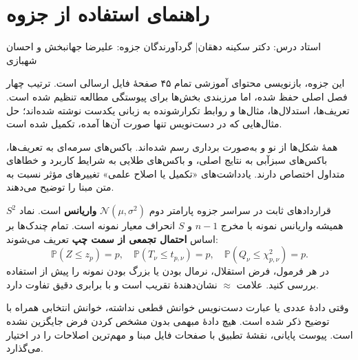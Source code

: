 \documentclass[12pt,a4paper,oneside]{report}
\newcounter{ex}[chapter]
\newcommand{\N}{\mathcal N}
\newcommand{\Prob}{\mathbb P}
\begin{document}
\setcounter{chapter}{0}
\chapter*{راهنمای استفاده از جزوه}
\begin{center}{\small\color{muted} استاد درس: دکتر سکینه دهقان\quad | \quad گردآورندگان جزوه: علیرضا جهانبخش و احسان شهبازی}\end{center}

این جزوه، بازنویسی محتوای آموزشی تمام ۴۵ صفحهٔ فایل ارسالی است. ترتیب چهار فصل اصلی حفظ شده، اما مرزبندی بخش‌ها برای پیوستگی مطالعه تنظیم شده است. تعریف‌ها، استدلال‌ها، مثال‌ها و روابط تکرارشونده به زبانی یکدست نوشته شده‌اند؛ حل مثال‌هایی که در دست‌نویس تنها صورت آن‌ها آمده، تکمیل شده است.

همهٔ شکل‌ها از نو و به‌صورت برداری رسم شده‌اند. باکس‌های سرمه‌ای به تعریف‌ها، باکس‌های سبزآبی به نتایج اصلی، و باکس‌های طلایی به شرایط کاربرد و خطاهای متداول اختصاص دارند. یادداشت‌های «تکمیل یا اصلاح علمی» تغییرهای مؤثر نسبت به متن مبنا را توضیح می‌دهند.
\begin{important}{قراردادهای ثابت در سراسر جزوه}
پارامتر دوم $\N(\mu,\sigma^2)$ \textbf{واریانس} است. نماد $S^2$ همیشه واریانس نمونه با مخرج $n-1$ و $S$ انحراف معیار نمونه است. تمام چندک‌ها بر اساس \textbf{احتمال تجمعی از سمت چپ} تعریف می‌شوند:
\[
\Prob(Z\le z_p)=p,\quad
\Prob(T_\nu\le t_{p,\nu})=p,\quad
\Prob(Q_\nu\le\chi^2_{p,\nu})=p.
\]
در هر فرمول، فرض استقلال، نرمال بودن یا بزرگ بودن نمونه را پیش از استفاده بررسی کنید. علامت $\approx$ نشان‌دهندهٔ تقریب است و با برابری دقیق تفاوت دارد.
\end{important}
وقتی دادهٔ عددی یا عبارت دست‌نویس خوانش قطعی نداشته، خوانش انتخابی همراه با توضیح ذکر شده است. هیچ دادهٔ مبهمی بدون مشخص کردن فرض جایگزین نشده است. پیوست پایانی، نقشهٔ تطبیق با صفحات فایل مبنا و مهم‌ترین اصلاحات را در اختیار می‌گذارد.
\end{document}
